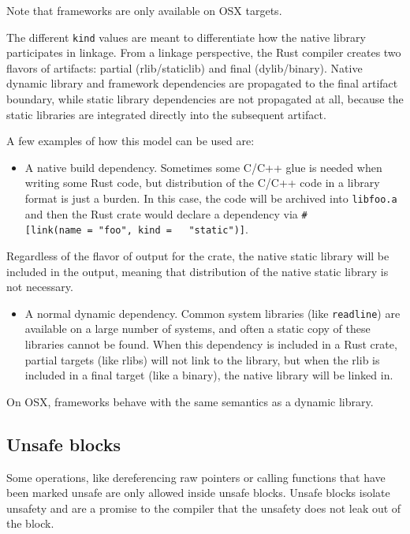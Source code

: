 \documentclass[a4paper,]{book}
\providecommand{\tightlist}{%
  \setlength{\itemsep}{0pt}\setlength{\parskip}{0pt}}
\begin{document}
Note that frameworks are only available on OSX targets.

The different \texttt{kind} values are meant to differentiate how the
native library participates in linkage. From a linkage perspective, the
Rust compiler creates two flavors of artifacts: partial (rlib/staticlib)
and final (dylib/binary). Native dynamic library and framework
dependencies are propagated to the final artifact boundary, while static
library dependencies are not propagated at all, because the static
libraries are integrated directly into the subsequent artifact.

A few examples of how this model can be used are:

\begin{itemize}
\tightlist
\item
  A native build dependency. Sometimes some C/C++ glue is needed when
  writing some Rust code, but distribution of the C/C++ code in a
  library format is just a burden. In this case, the code will be
  archived into \texttt{libfoo.a} and then the Rust crate would declare
  a dependency via
  \texttt{\#{[}link(name\ =\ "foo",\ kind\ =\ \ \ "static"){]}}.
\end{itemize}

Regardless of the flavor of output for the crate, the native static
library will be included in the output, meaning that distribution of the
native static library is not necessary.

\begin{itemize}
\tightlist
\item
  A normal dynamic dependency. Common system libraries (like
  \texttt{readline}) are available on a large number of systems, and
  often a static copy of these libraries cannot be found. When this
  dependency is included in a Rust crate, partial targets (like rlibs)
  will not link to the library, but when the rlib is included in a final
  target (like a binary), the native library will be linked in.
\end{itemize}

On OSX, frameworks behave with the same semantics as a dynamic library.

\subsection{Unsafe blocks}\label{unsafe-blocks}

Some operations, like dereferencing raw pointers or calling functions
that have been marked unsafe are only allowed inside unsafe blocks.
Unsafe blocks isolate unsafety and are a promise to the compiler that
the unsafety does not leak out of the block.
\end{document}
